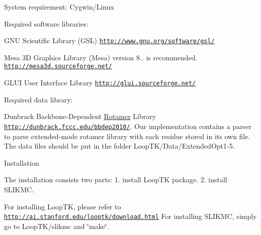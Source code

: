 System requirement\-: Cygwin/\-Linux

Required software libraries\-:

G\-N\-U Scientific Library (G\-S\-L) \href{http://www.gnu.org/software/gsl/}{\tt http\-://www.\-gnu.\-org/software/gsl/}

Mesa 3\-D Graphics Library (Mesa) version 8.. is recommended. \href{http://mesa3d.sourceforge.net/}{\tt http\-://mesa3d.\-sourceforge.\-net/}

G\-L\-U\-I User Interface Library \href{http://glui.sourceforge.net/}{\tt http\-://glui.\-sourceforge.\-net/}

Required data library\-:

Dunbrack Backbone-\/\-Dependent \hyperlink{classRotamer}{Rotamer} Library \href{http://dunbrack.fccc.edu/bbdep2010/}{\tt http\-://dunbrack.\-fccc.\-edu/bbdep2010/}. Our implementation contains a parser to parse extended-\/mode rotamer library with each residue stored in its own file. The data files should be put in the folder Loop\-T\-K/\-Data/\-Extended\-Opt1-\/5.

Installation

The installation consists two parts\-: 1. install Loop\-T\-K package. 2. install S\-L\-I\-K\-M\-C.

For installing Loop\-T\-K, please refer to \href{http://ai.stanford.edu/looptk/download.html}{\tt http\-://ai.\-stanford.\-edu/looptk/download.\-html} For installing S\-L\-I\-K\-M\-C, simply go to Loop\-T\-K/slikmc and \char`\"{}make\char`\"{}. 